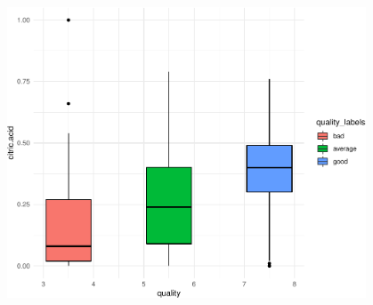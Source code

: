 \begin{frame}
\framebreak
 
\includegraphics[width=0.8\textwidth,height=0.7\textheight,keepaspectratio]{examples/ex-ggplot-11-crop.pdf}

\end{frame}




